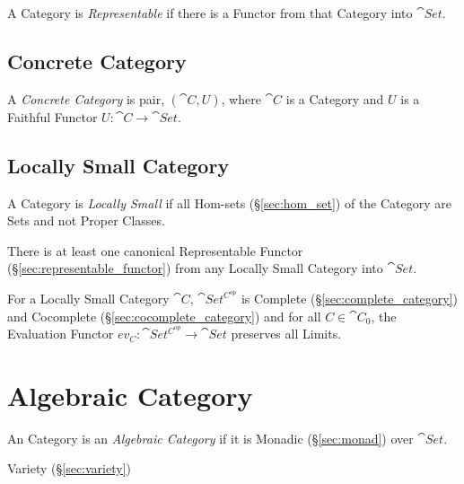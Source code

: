 A Category is \emph{Representable} if there is a Functor from that
Category into $\cat{Set}$.



\subsection{Concrete Category}\label{sec:concrete_category}

A \emph{Concrete Category} is pair, $(\cat{C},U)$, where
$\cat{C}$ is a Category and $U$ is a Faithful Functor $U :
\cat{C} \rightarrow \cat{Set}$.



\subsection{Locally Small Category}\label{sec:locally_small}

A Category is \emph{Locally Small} if all Hom-sets
(\S\ref{sec:hom_set}) of the Category are Sets and not Proper Classes.

There is at least one canonical Representable Functor
(\S\ref{sec:representable_functor}) from any Locally Small Category
into $\cat{Set}$.

For a Locally Small Category $\cat{C}$, $\cat{Set^{C^{op}}}$ is
Complete (\S\ref{sec:complete_category}) and Cocomplete
(\S\ref{sec:cocomplete_category}) and for all $C \in \cat{C}_0$,
the Evaluation Functor $ev_C : \cat{Set^{C^{op}}} \rightarrow
\cat{Set}$ preserves all Limits. \cite{awodey06}



\section{Algebraic Category}\label{sec:algebraic_category}

An Category is an \emph{Algebraic Category} if it is Monadic
(\S\ref{sec:monad}) over $\cat{Set}$.

Variety (\S\ref{sec:variety})



